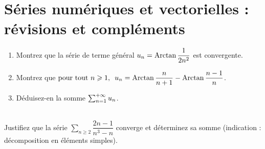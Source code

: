\chapter{Séries numériques et vectorielles : révisions et compléments}

\legendeexercices

\begin{exos}[Exercice 1]
\begin{enumerate}
    \item Montrez que la série de terme général \(u_n=\operatorname{Arctan}\dfrac{1}{2n^2}\) est convergente. \\
    \item Montrez que \(\quantifs{\tpt n\geq1}u_n=\Arctan\dfrac{n}{n+1}-\Arctan\dfrac{n-1}{n}\). \\
    \item Déduisez-en la somme \(\sum_{n=1}^{+\infty}u_n\).
\end{enumerate}
\end{exos}

\begin{corr}
\end{corr}

\begin{exos}[Exercice 2]~\\
Justifiez que la série \(\sum_{n\geq2}\dfrac{2n-1}{n^3-n}\) converge et déterminez sa somme (indication : décomposition en éléments simples).
\end{exos}

\begin{corr}
\end{corr}

